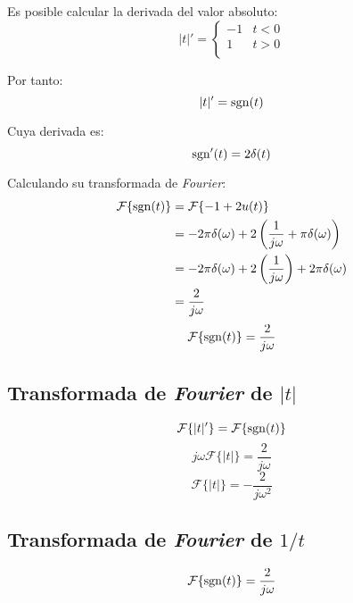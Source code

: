 Es posible calcular la derivada del valor absoluto:
\begin{equation*}
    |t|'=\begin{cases}
        -1&t<0\\
        1&t>0\\
    \end{cases}
\end{equation*}

Por tanto:
\begin{equation}
    |t|'=\operatorname{sgn}(t)
\end{equation}

Cuya derivada es:
\begin{equation}
    \operatorname{sgn}'(t)=2\delta(t)
\end{equation}

Calculando su transformada de \emph{Fourier}:
\begin{equation*}
\begin{split}
    \mathcal{F}\{\operatorname{sgn}(t)\}
        &=\mathcal{F}\{-1+2u(t)\}\\
        &=-2\pi\delta(\omega)
            +2\left(\frac{1}{j\omega}+\pi\delta(\omega)\right)\\
        &=-2\pi\delta(\omega)
            +2\left(\frac{1}{j\omega}\right)+2\pi\delta(\omega)\\
        &=\frac{2}{j\omega}
\end{split}
\end{equation*}
\begin{equation}
    \mathcal{F}\{\operatorname{sgn}(t)\}=\frac{2}{j\omega}
\end{equation}

\subsection{Transformada de \emph{Fourier} de $|t|$}
\begin{equation*}
    \mathcal{F}\{|t|'\}=\mathcal{F}\{\operatorname{sgn}(t)\}
\end{equation*}
\begin{equation*}
    j\omega\mathcal{F}\{|t|\}=\frac{2}{j\omega}
\end{equation*}
\begin{equation}
    \mathcal{F}\{|t|\}=-\frac{2}{j\omega^2}
\end{equation}

\subsection{Transformada de \emph{Fourier} de $1/t$}
\begin{equation*}
    \mathcal{F}\{\operatorname{sgn}(t)\}=\frac{2}{j\omega}
\end{equation*}

